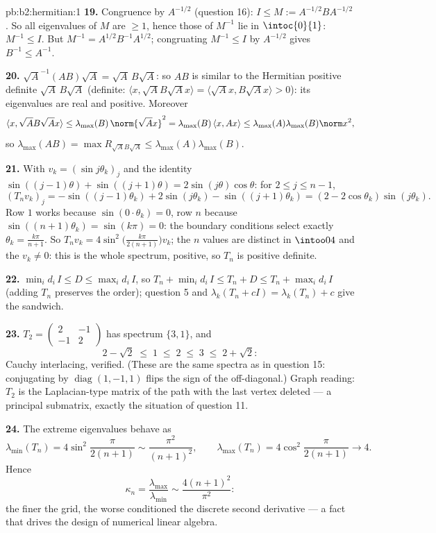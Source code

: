 \begin{solution}{pb:b2:hermitian:1}
\textbf{19.} Congruence by $A^{-1/2}$ (question 16): $I \leq M
:= A^{-1/2}BA^{-1/2}$. So all eigenvalues of $M$ are $\geq 1$,
hence those of $M^{-1}$ lie in $\intoc{0}{1}$: $M^{-1} \leq I$.
But $M^{-1} = A^{1/2}B^{-1}A^{1/2}$; congruating $M^{-1} \leq
I$ by $A^{-1/2}$ gives $B^{-1} \leq A^{-1}$.

\textbf{20.} $\sqrt A^{-1}(AB)\sqrt A = \sqrt A\,B\sqrt A$: so
$AB$ is similar to the Hermitian positive definite $\sqrt
A\,B\sqrt A$ (definite: $\langle x, \sqrt AB\sqrt Ax\rangle =
\langle \sqrt Ax, B\sqrt Ax\rangle > 0$): its eigenvalues are
real and positive. Moreover
\[
\langle x, \sqrt AB\sqrt Ax\rangle
\leq \lambda_{\max}(B)\,\norm{\sqrt Ax}^2
= \lambda_{\max}(B)\,\langle x, Ax\rangle
\leq \lambda_{\max}(A)\lambda_{\max}(B)\norm x^2 ,
\]
so $\lambda_{\max}(AB) = \max R_{\sqrt AB\sqrt A} \leq
\lambda_{\max}(A)\lambda_{\max}(B)$.

\textbf{21.} With $v_k = (\sin j\theta_k)_j$ and the identity
$\sin((j-1)\theta) + \sin((j+1)\theta) =
2\sin(j\theta)\cos\theta$: for $2 \leq j \leq n-1$,
\[
(T_nv_k)_j = -\sin((j{-}1)\theta_k) + 2\sin(j\theta_k) -
\sin((j{+}1)\theta_k)
= (2 - 2\cos\theta_k)\sin(j\theta_k) .
\]
Row $1$ works because $\sin(0\cdot\theta_k) = 0$, row $n$
because $\sin((n+1)\theta_k) = \sin(k\pi) = 0$: the boundary
conditions select exactly $\theta_k = \frac{k\pi}{n+1}$. So
$T_nv_k = 4\sin^2\bigl(\frac{k\pi}{2(n+1)}\bigr)v_k$; the $n$
values are distinct in $\intoo04$ and the $v_k \neq 0$: this is
the whole spectrum, positive, so $T_n$ is positive definite.

\textbf{22.} $\min_id_i\,I \leq D \leq \max_id_i\,I$, so $T_n +
\min_id_i\,I \leq T_n + D \leq T_n + \max_id_i\,I$
(adding $T_n$ preserves the order); question 5 and
$\lambda_k(T_n + cI) = \lambda_k(T_n) + c$ give the sandwich.

\textbf{23.} $T_2 = \begin{pmatrix} 2 & -1\\ -1 &
2\end{pmatrix}$ has spectrum $\{3, 1\}$, and
\[
2 - \sqrt2 \;\leq\; 1 \;\leq\; 2 \;\leq\; 3 \;\leq\; 2 +
\sqrt2 :
\]
Cauchy interlacing, verified. (These are the same spectra as in
question 15: conjugating by $\operatorname{diag}(1,-1,1)$ flips
the sign of the off-diagonal.) Graph reading: $T_2$ is the
Laplacian-type matrix of the path with the last vertex deleted
--- a principal submatrix, exactly the situation of question
11.

\textbf{24.} The extreme eigenvalues behave as
\[
\lambda_{\min}(T_n) = 4\sin^2\frac{\pi}{2(n+1)}
\sim \frac{\pi^2}{(n+1)^2},
\qquad
\lambda_{\max}(T_n) = 4\cos^2\frac{\pi}{2(n+1)}
\longrightarrow 4 .
\]
Hence
\[
\kappa_n = \frac{\lambda_{\max}}{\lambda_{\min}}
\sim \frac{4(n+1)^2}{\pi^2} :
\]
the finer the grid, the worse conditioned the discrete second
derivative --- a fact that drives the design of numerical
linear algebra.


\end{solution}
